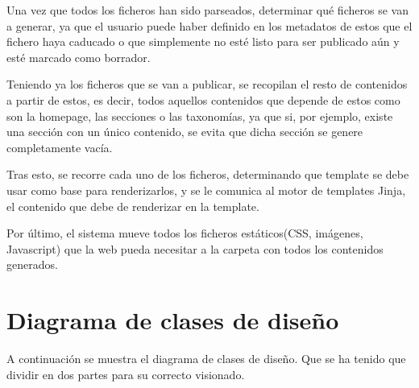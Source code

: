 Una vez que todos los ficheros han sido parseados, determinar qué ficheros se van a generar, ya que
el usuario puede haber definido en los metadatos de estos que el fichero haya caducado o que simplemente
no esté listo para ser publicado aún y esté marcado como borrador.

Teniendo ya los ficheros que se van a publicar, se recopilan el resto de contenidos a partir de estos, es decir,
todos aquellos contenidos que depende de estos como son la homepage, las secciones o las taxonomías, 
ya que si, por ejemplo, existe una sección con un único contenido, se evita que dicha sección se genere 
completamente vacía.

Tras esto, se recorre cada uno de los ficheros, determinando que template se debe usar como base para renderizarlos, 
y se le comunica al motor de templates Jinja, el contenido que debe de renderizar en la template.

Por último, el sistema mueve todos los ficheros estáticos(CSS, imágenes, Javascript) que la web pueda necesitar 
a la carpeta con todos los contenidos generados.



\section{Diagrama de clases de diseño}

A continuación se muestra el diagrama de clases de diseño. Que se ha tenido que dividir en dos partes
para su correcto visionado.

